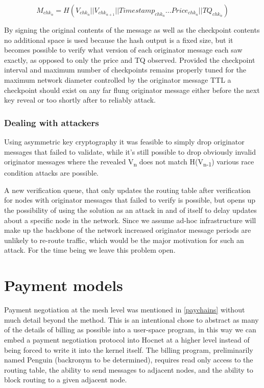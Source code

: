 \documentclass[11pt]{article}
\begin{document}
                        \[M_{chk_n} = H(V_{chk_n}||V_{chk_{n+1}}||Timestamp_{chk_n}...Price_{chk_n}||TQ_{chk_n})\]
                        
                        By signing the original contents of the message as well as the checkpoint contents no additional space is used because the hash output is a fixed size, but it becomes possible to verify what version of each originator message each saw exactly, as opposed to only the price and TQ observed. Provided the checkpoint interval and maximum number of checkpoints remains properly tuned for the maximum network diameter controlled by the originator message TTL a checkpoint should exist on any far flung originator message either before the next key reveal or too shortly after to reliably attack.
                                                
               \subsubsection{Dealing with attackers}
               
                      Using asymmetric key cryptography it was feasible to simply drop originator messages that failed to validate, while it's still possible to drop obviously invalid originator messages where the revealed V\textsubscript{n} does not match H(V\textsubscript{n-1}) various race condition attacks are possible. 
                          
                      A new verification queue, that only updates the routing table after verification for nodes with originator messages that failed to verify is possible, but opens up the possibility of using the solution as an attack in and of itself to delay updates about a specific node in the network. Since we assume ad-hoc infrastructure will make up the backbone of the network increased originator message periods are unlikely to re-route traffic, which would be the major motivation for such an attack. For the time being we leave this problem open.
                
\section{Payment models} \label{pay}

    Payment negotiation at the mesh level was mentioned in \ref{paychains} without much detail beyond the method. This is an intentional chose to abstract as many of the details of billing as possible into a user-space program, in this way we can embed a payment negotiation protocol into Hocnet at a higher level instead of being forced to write it into the kernel itself. The billing program, preliminarily named Penguin (backronym to be determined), requires read only access to the routing table, the ability to send messages to adjacent nodes, and the ability to block routing to a given adjacent node.
    
\end{document}
